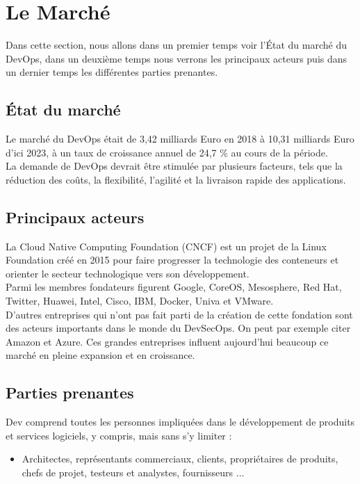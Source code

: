 \documentclass[11pt,a4paper,oneside]{book}
\begin{document}
\newpage

\section{Le Marché}

Dans cette section, nous allons dans un premier temps voir l'État du marché du DevOps, dans un deuxième temps nous verrons les principaux acteurs puis dans un dernier temps les différentes parties prenantes.

\subsection{État du marché}

Le marché du DevOps était de 3,42 milliards Euro en 2018 à 10,31 milliards Euro d'ici 2023, à un taux de croissance annuel de 24,7 \% au cours de la période. \\

La demande de DevOps devrait être stimulée par plusieurs facteurs, tels que la réduction des coûts, la flexibilité, l'agilité et la livraison rapide des applications.

\subsection{Principaux acteurs}

La Cloud Native Computing Foundation (CNCF) est un projet de la Linux Foundation créé en 2015 pour faire progresser la technologie des conteneurs et orienter le secteur technologique vers son développement. \\

Parmi les membres fondateurs figurent Google, CoreOS, Mesosphere, Red Hat, Twitter, Huawei, Intel, Cisco, IBM, Docker, Univa et VMware. \\

D'autres entreprises qui n'ont pas fait parti de la création de cette fondation sont des acteurs importants dans le monde du DevSecOps. On peut par exemple citer Amazon et Azure.
Ces grandes entreprises influent aujourd'hui beaucoup ce marché en pleine expansion et en croissance.

\subsection{Parties prenantes}

Dev comprend toutes les personnes impliquées dans le développement de produits et services logiciels, y compris, mais sans s'y limiter : \\
\begin{itemize}
\item Architectes, représentants commerciaux, clients, propriétaires de produits, chefs de projet, testeurs et analystes, fournisseurs ... \\
\end{itemize}
\end{document}
